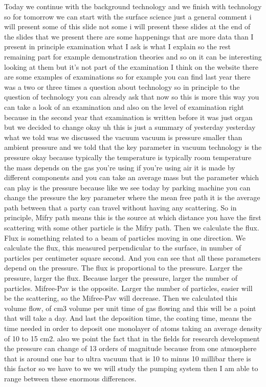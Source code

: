 Today we continue with the background technology and we finish with technology so for tomorrow we can start with the surface science just a general comment i will present some of this slide not some i will present these slides at the end of the slides that we present there are some happenings that are more data than I present in principle examination what I ask is what I explain so the rest remaining part for example demonstration theories and so on it can be interesting looking at them but it's not part of the examination I think on the website there are some examples of examinations so for example you can find last year there was a two or three times a question about technology so in principle to the question of technology you can already ask that now so this is more this way you can take a look of an examination and also on the level of examination right because in the second year that examination is written before it was just organ but we decided to change okay uh this is just a summary of yesterday yesterday what we told was we discussed the vacuum vacuum is pressure smaller than ambient pressure and we told that the key parameter in vacuum technology is the pressure okay because typically the temperature is typically room temperature the mass depends on the gas you're using if you're using air it is made by different components and you can take an average mass but the parameter which can play is the pressure because like we see today by parking machine you can change the pressure the key parameter where the mean free path it is the average path between that a party can travel without having any scattering. So in principle, Mifry path means this is the source at which distance you have the first scattering with some other particle is the Mifry path. Then we calculate the flux. Flux is something related to a beam of particles moving in one direction. We calculate the flux, this measured perpendicular to the surface, in number of particles per centimeter square second. And you can see that all these parameters depend on the pressure. The flux is proportional to the pressure. Larger the pressure, larger the flux. Because larger the pressure, larger the number of particles. Mifree-Pav is the opposite. Larger the number of particles, easier will be the scattering, so the Mifree-Pav will decrease. Then we calculated this volume flow, of cm3 volume per unit time of gas flowing and this will be a point that will take a day. And last the deposition time, the coating time, means the time needed in order to deposit one monolayer of atoms taking an average density of 10 to 15 cm2. also we point the fact that in the fields for research development the pressure can change of 13 orders of magnitude because from one atmosphere that is around one bar to ultra vacuum that is 10 to minus 10 millibar there is this factor so we have to we we will study the pumping system then I am able to range between these enormous differences.
